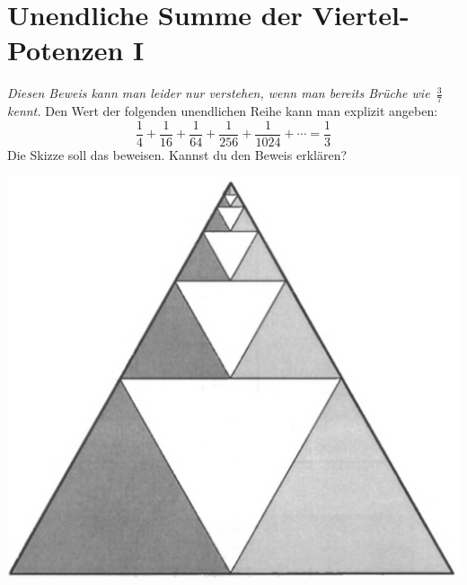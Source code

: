 \documentclass{../../zirkelblatt}
\begin{document}
\vfill
\section*{Unendliche Summe der Viertel-Potenzen I}
\emph{Diesen Beweis kann man leider nur verstehen, wenn man bereits Brüche
wie~$\frac{3}{7}$ kennt.}
Den Wert der folgenden unendlichen Reihe kann man
explizit angeben:
\[ \frac{1}{4} + \frac{1}{16} + \frac{1}{64} +
\frac{1}{256} + \frac{1}{1024} + \cdots = \frac{1}{3} \]
Die Skizze soll das beweisen. Kannst du den Beweis erklären?
\begin{center}
\includegraphics[scale=0.3]{geometrische-reihe-1}
\end{center}


\vfill
\end{document}

